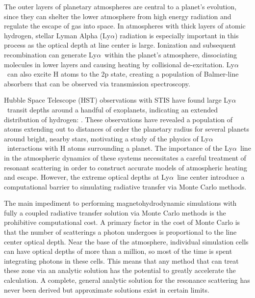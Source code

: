 \documentclass{aastex63}
\newcommand\lya{Ly$\alpha$\ }
\begin{document}
The outer layers of planetary atmospheres are central to a planet's evolution, since they can shelter the lower atmosphere from high energy radiation and regulate the escape of gas into space. In atmospheres with thick layers of atomic hydrogen, stellar Lyman Alpha (Ly$\alpha$) radiation is especially important in this process as the optical depth at line center is large. Ionization and subsequent recombination can generate \lya within the planet's atmosphere, dissociating molecules in lower layers and causing heating by collisional de-excitation. \lya can also excite H atoms to the 2p state, creating a population of Balmer-line absorbers that can be observed via transmission spectroscopy.

Hubble Space Telescope (HST) observations with STIS have found large \lya transit depths around a handful of exoplanets, indicating an extended distribution of hydrogen: \citet{2003Natur.422..143V, 2012A&A...543L...4L, 2012A&A...547A..18E, 2015Natur.522..459E,  2017A&A...597A..26B, 2017A&A...599L...3B, 2017A&A...602A.106B, 2018A&A...620A.147B, 2019AJ....158...50W, 2019EPSC...13.1928L, 2020ApJ...888L..21G,2021arXiv210309864B}. These observations have revealed a population of atoms extending out to distances of order the planetary radius for several planets around bright, nearby stars, motivating a study of the physics of \lya interactions with H atoms surrounding a planet. The importance of the \lya line in the atmospheric dynamics of these systems necessitates a careful treatment of resonant scattering in order to construct accurate models of atmospheric heating and escape. However, the extreme optical depths at \lya line center introduce a computational barrier to simulating radiative transfer via Monte Carlo methods.

The main impediment to performing magnetohydrodynamic simulations with fully a coupled radiative transfer solution via Monte Carlo methods is the prohibitive computational cost. A primary factor in the cost of Monte Carlo is that the number of scatterings a photon undergoes is proportional to the line center optical depth.  Near the base of the atmosphere, individual simulation cells can have optical depths of more than a million, so most of the time is spent integrating photons in these cells. This means that any method that can treat these zone via an analytic solution has the potential to greatly accelerate the calculation. A complete, general analytic solution for the resonance scattering has never been derived but approximate solutions exist in certain limits.
\end{document}

